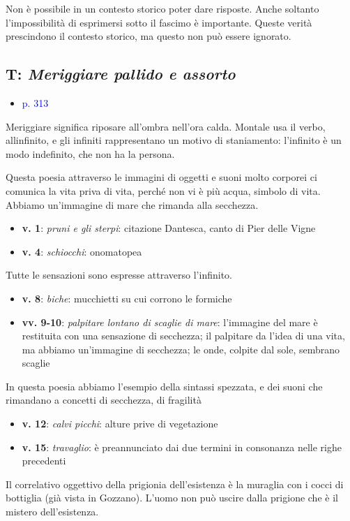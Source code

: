 \documentclass[a4paper, twoside, titlepage]{book}
\newcounter{mar}
\newcommand{\elenco}[1]{%
\begin{itemize}
#1
\end{itemize}}
\renewcommand{\emph}[1]{\textcolor{blue}{#1}}
\begin{document}
Non è possibile in un contesto storico poter dare risposte. Anche soltanto l'impossibilità di esprimersi sotto il fascimo è importante. Queste verità prescindono il contesto storico, ma questo non può essere ignorato.

\subsection{T: \textit{Meriggiare pallido e assorto}}
\elenco{\item \emph{p. 313}}

Meriggiare significa riposare all'ombra nell'ora calda. Montale usa il verbo, allinfinito, e gli infiniti rappresentano un motivo di staniamento: l'infinito è un modo indefinito, che non ha la persona.

Questa poesia attraverso le immagini di oggetti e suoni molto corporei ci comunica la vita priva di vita, perché non vi è più acqua, simbolo di vita. Abbiamo un'immagine di mare che rimanda alla secchezza.

\elenco{\item \textbf{v. 1}: \textit{pruni e gli sterpi}: citazione Dantesca, canto di Pier delle Vigne\item \textbf{v. 4}: \textit{schiocchi}: onomatopea}

Tutte le sensazioni sono espresse attraverso l'infinito.

\elenco{\item \textbf{v. 8}: \textit{biche}: mucchietti su cui corrono le formiche\item \textbf{vv. 9-10}: \textit{palpitare lontano di scaglie di mare}: l'immagine del mare è restituita con una sensazione di secchezza; il palpitare da l'idea di una vita, ma abbiamo un'immagine di secchezza; le onde, colpite dal sole, sembrano scaglie}

In questa poesia abbiamo l'esempio della sintassi spezzata, e dei suoni che rimandano a concetti di secchezza, di fragilità

\elenco{\item \textbf{v. 12}: \textit{calvi picchi}: alture prive di vegetazione\item \textbf{v. 15}: \textit{travaglio}: è preannunciato dai due termini in consonanza nelle righe precedenti}

Il correlativo oggettivo della prigionia dell'esistenza è la muraglia con i cocci di bottiglia (già vista in Gozzano). L'uomo non può uscire dalla prigione che è il mistero dell'esistenza.
\end{document}
